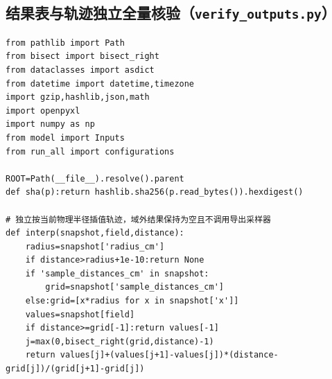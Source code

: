 \subsection{结果表与轨迹独立全量核验（\texttt{verify\_outputs.py}）}
\begin{Verbatim}[fontsize=\scriptsize,breaklines=true,breakanywhere=true]
from pathlib import Path
from bisect import bisect_right
from dataclasses import asdict
from datetime import datetime,timezone
import gzip,hashlib,json,math
import openpyxl
import numpy as np
from model import Inputs
from run_all import configurations

ROOT=Path(__file__).resolve().parent
def sha(p):return hashlib.sha256(p.read_bytes()).hexdigest()

# 独立按当前物理半径插值轨迹，域外结果保持为空且不调用导出采样器
def interp(snapshot,field,distance):
    radius=snapshot['radius_cm']
    if distance>radius+1e-10:return None
    if 'sample_distances_cm' in snapshot:
        grid=snapshot['sample_distances_cm']
    else:grid=[x*radius for x in snapshot['x']]
    values=snapshot[field]
    if distance>=grid[-1]:return values[-1]
    j=max(0,bisect_right(grid,distance)-1)
    return values[j]+(values[j+1]-values[j])*(distance-grid[j])/(grid[j+1]-grid[j])


\end{Verbatim}
